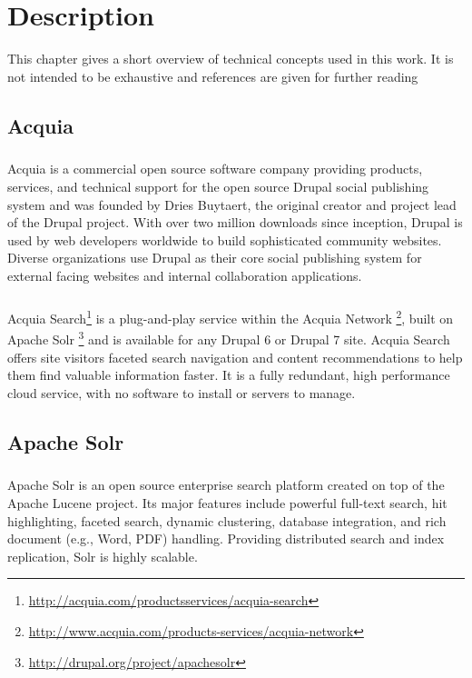 \chapter{Description}
\label{chap:description}
This chapter gives a short overview of technical concepts used in this work. It is not intended
to be exhaustive and references are given for further reading

\section{Acquia}
\paragraph{} 
Acquia is a commercial open source software company providing products, services, and technical support for the open source Drupal social publishing system and was founded by Dries Buytaert, the original creator and project lead of the Drupal project. With over two million downloads since inception, Drupal is used by web developers worldwide to build sophisticated community websites. Diverse organizations use Drupal as their core social publishing system for external facing websites and internal collaboration applications.

\paragraph{}
Acquia Search\footnote{\url{http://acquia.com/productsservices/acquia-search}} is a plug-and-play service within the Acquia Network \footnote{\url{http://www.acquia.com/products-services/acquia-network}}, built on Apache Solr \footnote{\url{http://drupal.org/project/apachesolr}} and is available for any Drupal 6 or Drupal 7 site. Acquia Search offers site visitors faceted search navigation and content recommendations to help them find valuable information faster. It is a fully redundant, high performance cloud service, with no software to install or servers to manage.

\section{Apache Solr}
\paragraph{}
Apache Solr is an open source enterprise search platform created on top of the Apache Lucene project. Its major features include powerful full-text search, hit highlighting, faceted search, dynamic clustering, database integration, and rich document (e.g., Word, PDF) handling. Providing distributed search and index replication, Solr is highly scalable.

